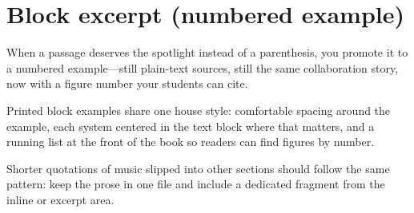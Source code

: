 \section{Block excerpt (numbered example)}

When a passage deserves the spotlight instead of a parenthesis, you promote it to a numbered example---still plain-text sources, still the same collaboration story, now with a figure number your students can cite.

Printed block examples share one house style: comfortable spacing around the example, each system centered in the text block where that matters, and a running list at the front of the book so readers can find figures by number.

\beginBookExampleMusic
{}
\finishBookExampleMusic
\finishBookExample

Shorter quotations of music slipped into other sections should follow the same pattern: keep the prose in one file and include a dedicated fragment from the inline or excerpt area.
